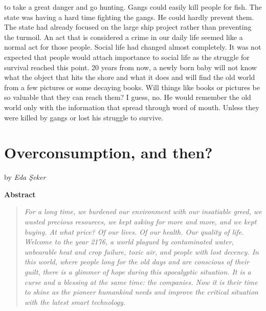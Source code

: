 \documentclass[]{book}
\begin{document}
to take a great danger and go hunting. Gangs could easily kill people for fish. The state was having a hard time fighting the gangs. He could hardly prevent them. The state had already focused on the large ship project rather than preventing the turmoil. An act that is considered a crime in our daily life seemed like a normal act for those people. Social life had changed almost completely. It was not expected that people would attach importance to social life as the struggle for survival reached this point. 20 years from now, a newly born baby will not know what the object that hits the shore and what it does and will find the old world from a few pictures or some decaying books. Will things like books or pictures be so valuable that they can reach them? I guess, no. He would remember the old world only with the information that spread through word of mouth. Unless they were killed by gangs or lost his struggle to survive.

\hypertarget{overconsumption-and-then}{%
\chapter{Overconsumption, and then?}\label{overconsumption-and-then}}

by \emph{Eda Şeker}

\textbf{Abstract}

\begin{quote}
\emph{For a long time, we burdened our environment with our insatiable greed, we wasted precious resources, we kept asking for more and more, and we kept buying. At what price? Of our lives. Of our health. Our quality of life. Welcome to the year 2176, a world plagued by contaminated water, unbearable heat and crop failure, toxic air, and people with lost decency. In this world, where people long for the old days and are conscious of their guilt, there is a glimmer of hope during this apocalyptic situation. It is a curse and a blessing at the same time: the companies. Now it is their time to shine as the pioneer humankind needs and improve the critical situation with the latest smart technology. }
\end{quote}
\end{document}
